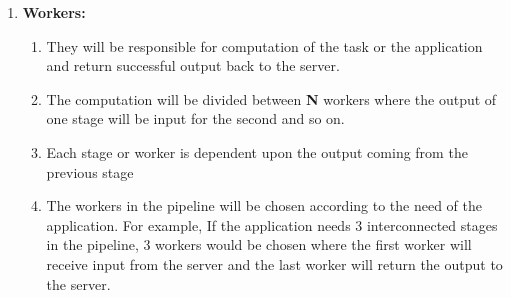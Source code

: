 \begin{enumerate}
{\begin{enumerate}
{				\begin{enumerate}
					\item {
						\textbf{User Facing Process}: This logical side of the server which will take input from the user to run an application over the pipelined workers. It will provide an interface in the form of a terminal window or a custom graphical user interface to the user to run their application.
					}
				
					\item {
						\textbf{Worker Facing Process}: This side of the server will accept input from the user facing side of the server and will be responsible for dividing up the task into stages for the pipeline. Once it divides the tasks, worker nodes are chosen for the pipeline depending upon the number of stages needed for the application. Each stage is given to a worker node. This side also maintains the status of the workers along with communicating with neighboring workers for input, output or running status update.
					}
					
				\end{enumerate}
			}
		
			\item {
				\textbf{Workers:}
				
				\begin{enumerate}
					\item They will be responsible for computation of the task or the application and return successful output back to the server.
					
					\item The computation will be divided between \textbf{N} workers where the output of one stage will be input for the second and so on.
					
					\item Each stage or worker is dependent upon the output coming from the previous stage
					
					\item The workers in the pipeline will be chosen according to the need of the application. For example, If the application needs 3 interconnected stages in the pipeline, 3 workers would be chosen where the first worker will receive input from the server and the last worker will return the output to the server.
				\end{enumerate}
			}
		\end{enumerate}
	}
\end{enumerate}